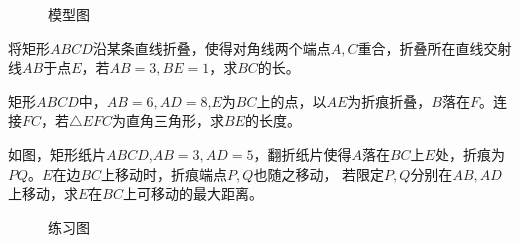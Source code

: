 \begin{figure}[H]
    \centering
    \resizebox{4cm}{!}{}
    \caption{模型图}
\end{figure}
\begin{problem}
将矩形$ABCD$沿某条直线折叠，使得对角线两个端点$A,C$重合，折叠所在直线交射线$AB$于点$E$，若$AB=3,BE=1$，求$BC$的长。
\end{problem}
\begin{problem}
矩形$ABCD$中，$AB=6,AD=8$,$E$为$BC$上的点，以$AE$为折痕折叠，$B$落在$F$。连接$FC$，若$\triangle EFC$为直角三角形，求$BE$的长度。
\end{problem}
\begin{problem}
如图，矩形纸片$ABCD$,$AB=3,AD=5$，翻折纸片使得$A$落在$BC$上$E$处，折痕为$PQ$。$E$在边$BC$上移动时，折痕端点$P,Q$也随之移动，
若限定$P,Q$分别在$AB,AD$上移动，求$E$在$BC$上可移动的最大距离。
\end{problem}
\begin{figure}[H]
    \centering
    \resizebox{4cm}{!}{}
    \caption{练习图}
\end{figure}
\clearpage
